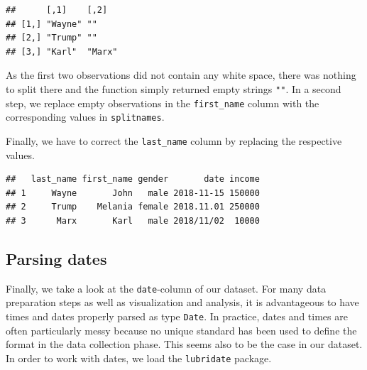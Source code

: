 \documentclass[
  12pt,
]{style/krantz}
\newenvironment{Shaded}{\begin{snugshade}}{\end{snugshade}}
\newcommand{\DecValTok}[1]{\textcolor[rgb]{0.00,0.00,0.81}{#1}}
\newcommand{\NormalTok}[1]{#1}
\newcommand{\OtherTok}[1]{\textcolor[rgb]{0.56,0.35,0.01}{#1}}
\newcommand{\SpecialCharTok}[1]{\textcolor[rgb]{0.00,0.00,0.00}{#1}}
\newcommand{\StringTok}[1]{\textcolor[rgb]{0.31,0.60,0.02}{#1}}
\begin{document}
\begin{verbatim}
##      [,1]    [,2]  
## [1,] "Wayne" ""    
## [2,] "Trump" ""    
## [3,] "Karl"  "Marx"
\end{verbatim}

As the first two observations did not contain any white space, there was nothing to split there and the function simply returned empty strings \texttt{""}. In a second step, we replace empty observations in the \texttt{first\_name} column with the corresponding values in \texttt{splitnames}.

\begin{Shaded}
\end{Shaded}

Finally, we have to correct the \texttt{last\_name} column by replacing the respective values.

\begin{Shaded}
\end{Shaded}

\begin{verbatim}
##   last_name first_name gender       date income
## 1     Wayne       John   male 2018-11-15 150000
## 2     Trump    Melania female 2018.11.01 250000
## 3      Marx       Karl   male 2018/11/02  10000
\end{verbatim}

\hypertarget{parsing-dates}{%
\subsection{Parsing dates}\label{parsing-dates}}

Finally, we take a look at the \texttt{date}-column of our dataset. For many data preparation steps as well as visualization and analysis, it is advantageous to have times and dates properly parsed as type \texttt{Date}. In practice, dates and times are often particularly messy because no unique standard has been used to define the format in the data collection phase. This seems also to be the case in our dataset. In order to work with dates, we load the \texttt{lubridate} package.
\end{document}

